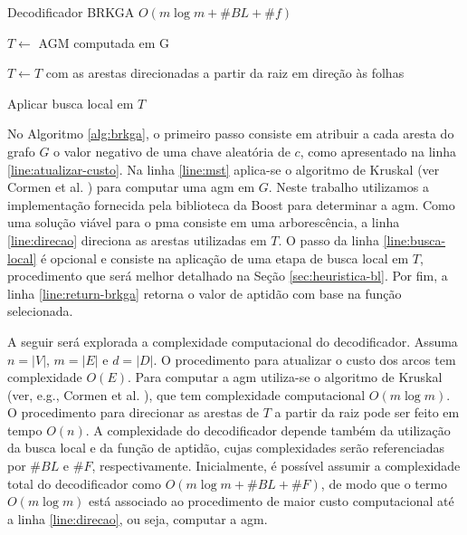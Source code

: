 \begin{algorithm}[!ht]
  \caption{Decodificador BRKGA $O(m \log m + \#BL + \#f)$ \label{alg:brkga}}


  $T \leftarrow$ AGM computada em G\; \label{line:mst}

  $T \leftarrow T$ com as arestas direcionadas a partir da raiz em direção às folhas\; \label{line:direcao}

  Aplicar busca local em $T$\; \label{line:busca-local}

  \; \label{line:return-brkga}
\end{algorithm}

No  Algoritmo \ref{alg:brkga},  o primeiro  passo  consiste em  atribuir a  cada
aresta  do grafo  $G$ o  valor  negativo de  uma  chave aleatória  de $c$,  como
apresentado  na linha  \eqref{line:atualizar-custo}.  Na linha  \eqref{line:mst}
aplica-se o  algoritmo de  Kruskal (ver Cormen  et al.  \cite{cormen:2009}) para
computar  uma  \gls{agm}  em  $G$. Neste  trabalho  utilizamos  a  implementação
fornecida pela biblioteca da Boost para determinar a \gls{agm}. Como uma solução
viável   para   o   \gls{pma}   consiste   em   uma   arborescência,   a   linha
\eqref{line:direcao} direciona  as arestas utilizadas  em $T$. O passo  da linha
\eqref{line:busca-local}  é opcional  e consiste  na aplicação  de uma  etapa de
busca  local   em  $T$,  procedimento   que  será  melhor  detalhado   na  Seção
\ref{sec:heuristica-bl}. Por  fim, a  linha \eqref{line:return-brkga}  retorna o
valor de aptidão com base na função selecionada.

A seguir será explorada a complexidade computacional do decodificador. Assuma $n
= |V|$, $m =  |E|$ e $d = |D|$. O procedimento para  atualizar o custo dos arcos
tem complexidade  $O(E)$. Para  computar a \gls{agm}  utiliza-se o  algoritmo de
Kruskal  (ver, e.g.,  Cormen et  al. \cite{cormen:2009}),  que tem  complexidade
computacional $O(m \log m)$. O procedimento  para direcionar as arestas de $T$ a
partir da raiz  pode ser feito em tempo $O(n)$.  A complexidade do decodificador
depende  também da  utilização da  busca  local e  da função  de aptidão,  cujas
complexidades  serão   referenciadas  por   $\#BL$  e   $\#F$,  respectivamente.
Inicialmente, é possível assumir a complexidade total do decodificador como $O(m
\log m  + \#BL  + \#F)$, de  modo que o  termo $O(m  \log m)$ está  associado ao
procedimento de maior  custo computacional até a  linha \eqref{line:direcao}, ou
seja, computar a \gls{agm}.

